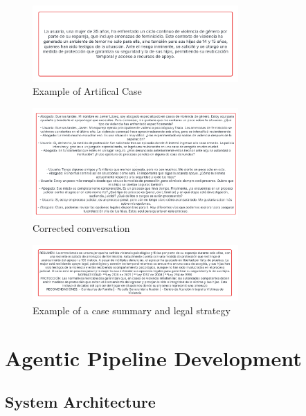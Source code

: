 \begin{figure}[htbp]
    \centering
    \includegraphics[width=0.7\textwidth]{figures/Artificial_case_summary.png}
    \caption{Example of Artifical Case}
    \label{fig:Artificial_case_summary}
\end{figure}

\begin{figure}[htbp]
    \centering
    \includegraphics[width=0.7\textwidth]{figures/corrected_conversation.png}
    \caption{Corrected conversation}
    \label{fig:corrected_conversation}
\end{figure}

\begin{figure}[htbp]
    \centering
    \includegraphics[width=0.7\textwidth]{figures/output_summary.png}
    \caption{Example of a case summary and legal strategy}
    \label{fig:output_summary}
\end{figure}

\section{Agentic Pipeline Development}
\subsection{System Architecture}
\label{sec:architecture}

